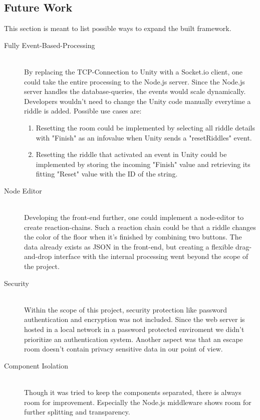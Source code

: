 \subsection{Future Work}
This section is meant to list possible ways to expand the built framework.
\begin{description}
    \item [Fully Event-Based-Processing]\hfill \\ 
    By replacing the TCP-Connection to Unity with a Socket.io client, 
    one could take the entire processing to the Node.js server. 
    Since the Node.js server handles the database-queries,
    the events would scale dynamically. 
    Developers wouldn't need to change the Unity code manually everytime a riddle is added. 
    Possible use cases are:
    \begin{enumerate}
        \item Resetting the room could be implemented by selecting all riddle details with "Finish" as an infovalue when Unity sends a "resetRiddles" event.
        \item 
        Resetting the riddle that activated an event in Unity could be implemented by storing the incoming "Finish" 
        value and retrieving its fitting "Reset" value with the ID of the string.
    \end{enumerate}
    \item [Node Editor]\hfill \\
    Developing the front-end further, one could implement a node-editor to create reaction-chains. 
    Such a reaction chain could be that a riddle changes the color of the floor when it's finished by combining two buttons. 
    The data already exists as JSON in the front-end, but creating a flexible drag-and-drop interface with the internal processing 
    went beyond the scope of the project. 
    \item [Security] \hfill \\
    Within the scope of this project, security protection like password authentication and encryption was not included.
    Since the web server is hosted in a local network in a password protected enviroment we didn't prioritize an authentication system.
    Another aspect was that an escape room doesn't contain privacy sensitive data in our point of view.
    \item [Component Isolation]\hfill \\
    Though it was tried to keep the components separated, there is always room for improvement. 
    Especially the Node.js middleware shows room for further splitting and transparency.

\end{description}
